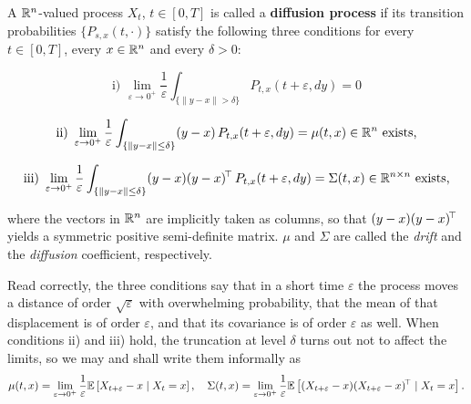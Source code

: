 \begin{definition}\label{def:diffusion}
    A $\mathbb{R}^n$-valued process $X_t$, $t\in [0,T]$ is called a \textbf{diffusion process} if its transition probabilities $\{P_{s,x}(t, \cdot )\}$ satisfy the following three conditions for every $t\in [0,T]$, every $x\in\mathbb{R}^n$ and every $\delta > 0$:

     \begin{equation*}
                 \text{i) }   \lim_ {\varepsilon \rightarrow 0^+ }\frac{1}{\varepsilon }  \int_ {\{\|y-x\|>\delta\}} P_{t,x}(t+\varepsilon,dy) = 0             \end{equation*}

                  \begin{equation*}
                 \text{ii) }   \lim_ {\varepsilon \rightarrow 0^+ }\frac{1}{\varepsilon }  \int_ {\{\|y-x\|\leq\delta\}} (y-x) \, P_{t,x}(t+\varepsilon,dy) = \mu(t,x) \in \mathbb{R}^n \text{ exists,}\end{equation*}

                        \begin{equation*}
                 \text{iii) }   \lim_ {\varepsilon \rightarrow 0^+ }\frac{1}{\varepsilon }  \int_ {\{\|y-x\|\leq\delta\}}  (y-x)(y-x)^{\!\top}  \, P_{t,x}(t+\varepsilon,dy) = \Sigma(t,x) \in \mathbb{R}^{n\times n} \text{ exists,}\end{equation*}

\noindent where the vectors in $\mathbb{R}^n$ are implicitly taken as columns, so that $(y-x)(y-x)^{\!\top}$ yields a symmetric positive semi-definite matrix. $\mu$ and $\Sigma$ are called the \textit{drift} and the \textit{diffusion} coefficient, respectively.
\end{definition}


Read correctly, the three conditions say that in a short time $\varepsilon$ the process moves a distance of order $\sqrt{\varepsilon}$ with overwhelming probability, that the mean of that displacement is of order $\varepsilon$, and that its covariance is of order $\varepsilon$ as well. When conditions ii) and iii) hold, the truncation at level $\delta$ turns out not to affect the limits, so we may and shall write them informally as
\[
\mu(t,x) = \lim_{\varepsilon \to 0^+}\frac{1}{\varepsilon}\mathbb{E}\left[X_{t+\varepsilon}-x \mid X_t = x\right], \quad
\Sigma(t,x) = \lim_{\varepsilon \to 0^+}\frac{1}{\varepsilon}\mathbb{E}\left[(X_{t+\varepsilon}-x)(X_{t+\varepsilon}-x)^{\!\top} \mid X_t = x\right]\text{.}
\]


